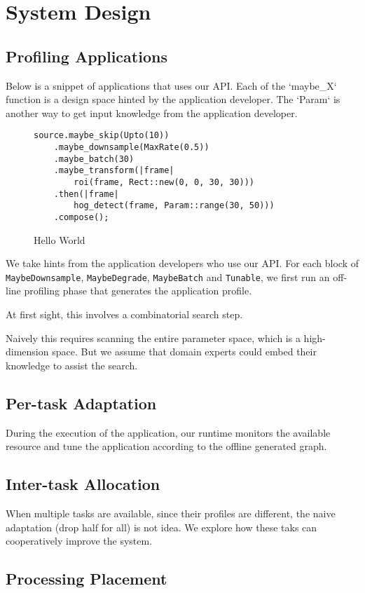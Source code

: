 \section{System Design}
\label{sec:system-design}

\subsection{Profiling Applications}
\label{sec:prof-appl}

Below is a snippet of applications that uses our API. Each of the `maybe\_X`
function is a design space hinted by the application developer. The `Param` is
another way to get input knowledge from the application developer.

\begin{figure}
  \begin{lstlisting}
source.maybe_skip(Upto(10))
    .maybe_downsample(MaxRate(0.5))
    .maybe_batch(30)
    .maybe_transform(|frame|
        roi(frame, Rect::new(0, 0, 30, 30)))
    .then(|frame|
        hog_detect(frame, Param::range(30, 50)))
    .compose();
  \end{lstlisting}
  \caption{Hello World}
  \label{fig:code}
\end{figure}

We take hints from the application developers who use our API. For each block of
\texttt{MaybeDownsample}, \texttt{MaybeDegrade}, \texttt{MaybeBatch} and
\texttt{Tunable}, we first run an off-line profiling phase that generates the
application profile.

At first sight, this involves a combinatorial search step.

Naively this requires scanning the entire parameter space, which is a
high-dimension space. But we assume that domain experts could embed their
knowledge to assist the search.

\subsection{Per-task Adaptation}
\label{sec:per-task-adaptation}

During the execution of the application, our runtime monitors the available
resource and tune the application according to the offline generated graph.

\subsection{Inter-task Allocation}
\label{sec:inter-task-alloc}

When multiple tasks are available, since their profiles are different, the naive
adaptation (drop half for all) is not idea. We explore how these taks can
cooperatively improve the system.

\subsection{Processing Placement}
\label{sec:processing-placement}

